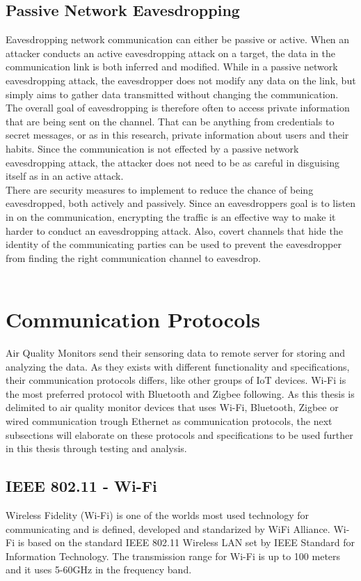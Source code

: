 \subsection{Passive Network Eavesdropping}
Eavesdropping network communication can either be passive or active. When an attacker conducts an active eavesdropping attack on a target, the data in the communication link is both inferred and modified. \cite{Eavesdropping} While in a passive network eavesdropping attack, the eavesdropper does not modify any data on the link, but simply aims to gather data transmitted without changing the communication. The overall goal of eavesdropping is therefore often to access private information that are being sent on the channel. That can be anything from credentials to secret messages, or as in this research, private information about users and their habits. \cite{Eavesdropping} Since the communication is not effected by a passive network eavesdropping attack, the attacker does not need to be as careful in disguising itself as in an active attack.  
\\
There are security measures to implement to reduce the chance of being eavesdropped, both actively and passively. Since an eavesdroppers goal is to listen in on the communication, encrypting the traffic is an effective way to make it harder to conduct an eavesdropping attack. Also, covert channels that hide the identity of the communicating parties can be used to prevent the eavesdropper from finding the right communication channel to eavesdrop. \cite{Eavesdropping}
\\\\
\section{Communication Protocols}
Air Quality Monitors send their sensoring data to remote server for storing and analyzing the data. As they exists with different functionality and specifications, their communication protocols differs, like other groups of IoT devices. \cite{AQMBigSource} Wi-Fi is the most preferred protocol with Bluetooth and Zigbee following. \cite{saini2020indoor} As this thesis is delimited to air quality monitor devices that uses Wi-Fi, Bluetooth, Zigbee or wired communication trough Ethernet as communication protocols, the next subsections will elaborate on these protocols and specifications to be used further in this thesis through testing and analysis. 

\subsection{IEEE 802.11 - Wi-Fi}
Wireless Fidelity (Wi-Fi) \cite{WiFiAlliance} is one of the worlds most used technology for communicating and is defined, developed and standarized by WiFi Alliance. \cite{WiFiAlliance} Wi-Fi is based on the standard IEEE 802.11 Wireless LAN set by IEEE Standard for Information Technology. \cite{WifiStandard} The transmission range for Wi-Fi is up to 100 meters and it uses 5-60GHz in the frequency band. \cite{IAQMonitorCommunicationReview}
\\\\

